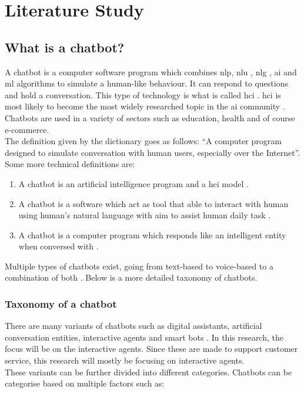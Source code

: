 \mainmatter
\pagestyle{headings}

\chapter{Literature Study}
\label{ch:literature-study}

\section{What is a chatbot?}
A chatbot is a computer software program which combines \acrfull{nlp}, \acrfull{nlu} , \acrfull{nlg} \citep{Adamopoulou2020}, \acrfull{ai} and \acrfull{ml} algorithms to simulate a human-like behaviour. It can respond to questions and hold a conversation. This type of technology is what is called \acrfull{hci} \citep{Adamopoulou2020}.  \acrshort{hci} is most likely to become the most widely researched topic in the \acrshort{ai} community \citep{Bansal2018}. Chatbots are used in a variety of sectors such as education, health and of course e-commerce.\\
\break
The definition given by the dictionary goes as follows: “A computer program designed to simulate conversation with human users, especially over the Internet”\citep{Lexico2022}. Some more technical definitions are:
\begin{enumerate}
    \item A chatbot is an artificial intelligence program and a \acrfull{hci} model \citep{Bansal2018}.
    \item A chatbot is a software which act as tool that able to interact with human using human’s natural language with aim to assist human daily task \citep{Muizzah2021}.
    \item A chatbot  is  a  computer  program  which  responds  like  an  intelligent  entity when  conversed  with \citep{Khanna2015}.
\end{enumerate}
\break
Multiple types of chatbots exist, going from text-based to voice-based to a combination of both \citep{Radziwil2021}. Below is a more detailed taxonomy of chatbots.\\

\subsection{Taxonomy of a chatbot}
There are many variants of chatbots such as digital assistants, artificial conversation entities, interactive agents and smart bots \citep{Adamopoulou2020}. In this research, the focus will be on the interactive agents. Since these are made to support customer service, this research will mostly be focusing on interactive agents.\\
\break
These variants can be further divided into different categories. Chatbots can be categorise based on multiple factors such as:\\

